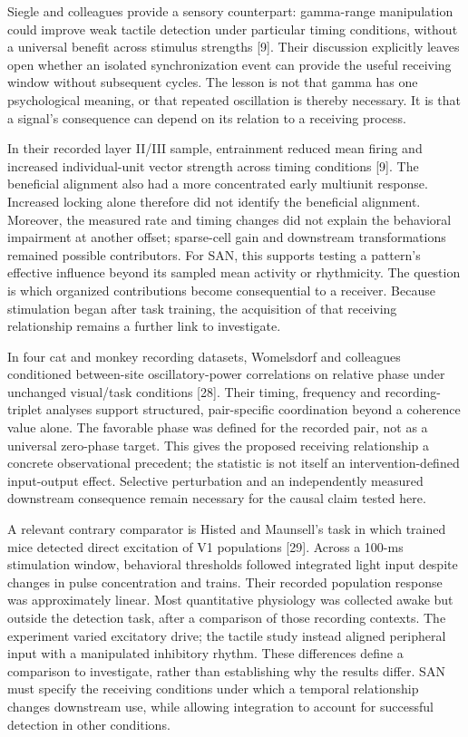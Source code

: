 \documentclass[
  american,
  11pt,
  letterpaper,
]{article}
\begin{document}
Siegle and colleagues provide a sensory counterpart: gamma-range manipulation could improve weak tactile detection under particular timing conditions, without a universal benefit across stimulus strengths {[}9{]}. Their discussion explicitly leaves open whether an isolated synchronization event can provide the useful receiving window without subsequent cycles. The lesson is not that gamma has one psychological meaning, or that repeated oscillation is thereby necessary. It is that a signal's consequence can depend on its relation to a receiving process.

In their recorded layer II/III sample, entrainment reduced mean firing and increased individual-unit vector strength across timing conditions {[}9{]}. The beneficial alignment also had a more concentrated early multiunit response. Increased locking alone therefore did not identify the beneficial alignment. Moreover, the measured rate and timing changes did not explain the behavioral impairment at another offset; sparse-cell gain and downstream transformations remained possible contributors. For SAN, this supports testing a pattern's effective influence beyond its sampled mean activity or rhythmicity. The question is which organized contributions become consequential to a receiver. Because stimulation began after task training, the acquisition of that receiving relationship remains a further link to investigate.

In four cat and monkey recording datasets, Womelsdorf and colleagues conditioned between-site oscillatory-power correlations on relative phase under unchanged visual/task conditions {[}28{]}. Their timing, frequency and recording-triplet analyses support structured, pair-specific coordination beyond a coherence value alone. The favorable phase was defined for the recorded pair, not as a universal zero-phase target. This gives the proposed receiving relationship a concrete observational precedent; the statistic is not itself an intervention-defined input-output effect. Selective perturbation and an independently measured downstream consequence remain necessary for the causal claim tested here.

A relevant contrary comparator is Histed and Maunsell's task in which trained mice detected direct excitation of V1 populations {[}29{]}. Across a 100-ms stimulation window, behavioral thresholds followed integrated light input despite changes in pulse concentration and trains. Their recorded population response was approximately linear. Most quantitative physiology was collected awake but outside the detection task, after a comparison of those recording contexts. The experiment varied excitatory drive; the tactile study instead aligned peripheral input with a manipulated inhibitory rhythm. These differences define a comparison to investigate, rather than establishing why the results differ. SAN must specify the receiving conditions under which a temporal relationship changes downstream use, while allowing integration to account for successful detection in other conditions.
\end{document}
